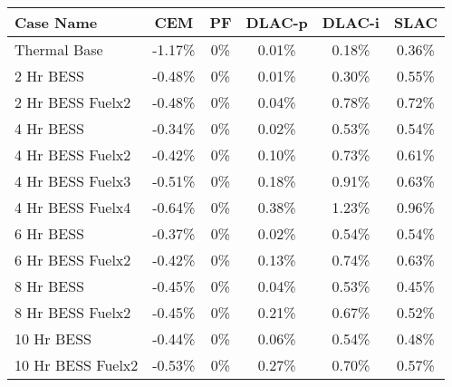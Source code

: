 \begin{tabular}{lccccc}
\toprule
Case Name & CEM & PF & DLAC-p & DLAC-i & SLAC \\
\midrule
Thermal Base & -1.17\% & 0\% & 0.01\% & 0.18\% & 0.36\% \\
2 Hr BESS & -0.48\% & 0\% & 0.01\% & 0.30\% & 0.55\% \\
2 Hr BESS Fuelx2 & -0.48\% & 0\% & 0.04\% & 0.78\% & 0.72\% \\
4 Hr BESS & -0.34\% & 0\% & 0.02\% & 0.53\% & 0.54\% \\
4 Hr BESS Fuelx2 & -0.42\% & 0\% & 0.10\% & 0.73\% & 0.61\% \\
4 Hr BESS Fuelx3 & -0.51\% & 0\% & 0.18\% & 0.91\% & 0.63\% \\
4 Hr BESS Fuelx4 & -0.64\% & 0\% & 0.38\% & 1.23\% & 0.96\% \\
6 Hr BESS & -0.37\% & 0\% & 0.02\% & 0.54\% & 0.54\% \\
6 Hr BESS Fuelx2 & -0.42\% & 0\% & 0.13\% & 0.74\% & 0.63\% \\
8 Hr BESS & -0.45\% & 0\% & 0.04\% & 0.53\% & 0.45\% \\
8 Hr BESS Fuelx2 & -0.45\% & 0\% & 0.21\% & 0.67\% & 0.52\% \\
10 Hr BESS & -0.44\% & 0\% & 0.06\% & 0.54\% & 0.48\% \\
10 Hr BESS Fuelx2 & -0.53\% & 0\% & 0.27\% & 0.70\% & 0.57\% \\
\bottomrule
\end{tabular}
